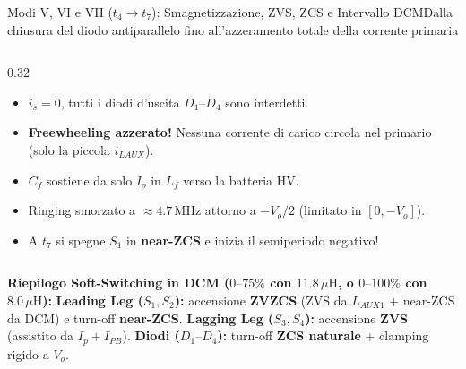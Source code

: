\documentclass[aspectratio=169,9pt]{beamer}
\newcommand{\MHz}{\,\text{MHz}}
\newcommand{\uH}{\,\mu\text{H}}
\begin{document}
\begin{frame}{Modi V, VI e VII ($t_4 \to t_7$): Smagnetizzazione, ZVS, ZCS e Intervallo DCM}{Dalla chiusura del diodo antiparallelo fino all'azzeramento totale della corrente primaria}
\begin{columns}[T,onlytextwidth]
\begin{column}{0.32\textwidth}
      \begin{notebox}[title={Modo VII ($t_6 \le t \le t_7$) --- DCM}]
        \begin{itemize}\setlength{\itemsep}{2pt}
          \item $i_s = 0$, tutti i diodi d'uscita $D_1\text{--}D_4$ sono interdetti.
          \item \textbf{Freewheeling azzerato!} Nessuna corrente di carico circola nel primario (solo la piccola $i_{LAUX}$).
          \item $C_f$ sostiene da solo $I_o$ in $L_f$ verso la batteria HV.
          \item Ringing smorzato a $\approx 4.7\MHz$ attorno a $-V_o/2$ (limitato in $[0, -V_o]$).
          \item A $t_7$ si spegne $S_1$ in \textbf{near-ZCS} e inizia il semiperiodo negativo!
        \end{itemize}
      \end{notebox}
    \end{column}
  \end{columns}

  \vspace*{2mm}
  \begin{formulabox}
    \textbf{Riepilogo Soft-Switching in DCM ($0\text{--}75\%$ con $11.8\uH$, o $0\text{--}100\%$ con $8.0\uH$):}\quad
    \textbf{Leading Leg ($S_1, S_2$):} accensione \textbf{ZVZCS} (ZVS da $L_{AUX1}$ + near-ZCS da DCM) e turn-off \textbf{near-ZCS}.\quad
    \textbf{Lagging Leg ($S_3, S_4$):} accensione \textbf{ZVS} (assistito da $I_p + I_{PB}$).\quad
    \textbf{Diodi ($D_1\text{--}D_4$):} turn-off \textbf{ZCS naturale} + clamping rigido a $V_o$.
  \end{formulabox}
\end{frame}
\end{document}
